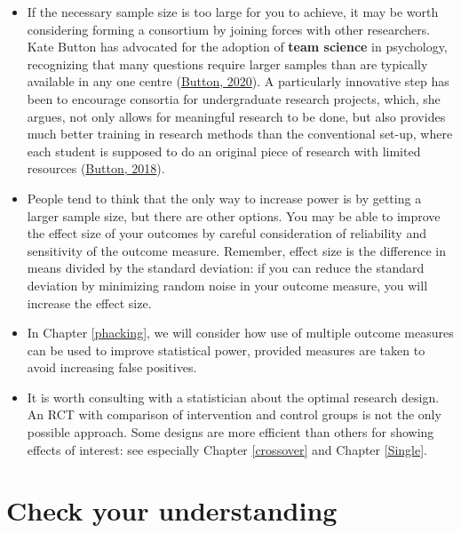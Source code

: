 \documentclass{krantz}
\providecommand{\tightlist}{%
\setlength{\itemsep}{0pt}\setlength{\parskip}{0pt}}
\begin{document}
\begin{itemize}
\tightlist
\item
  If the necessary sample size is too large for you to achieve, it may be worth considering forming a consortium by joining forces with other researchers. Kate Button has advocated for the adoption of \textbf{team science} in psychology, recognizing that many questions require larger samples than are typically available in any one centre (\protect\hyperlink{ref-button2020}{Button, 2020}). A particularly innovative step has been to encourage consortia for undergraduate research projects, which, she argues, not only allows for meaningful research to be done, but also provides much better training in research methods than the conventional set-up, where each student is supposed to do an original piece of research with limited resources (\protect\hyperlink{ref-button2018}{Button, 2018}).\\
\item
  People tend to think that the only way to increase power is by getting a larger sample size, but there are other options. You may be able to improve the effect size of your outcomes by careful consideration of reliability and sensitivity of the outcome measure. Remember, effect size is the difference in means divided by the standard deviation: if you can reduce the standard deviation by minimizing random noise in your outcome measure, you will increase the effect size.\\
\item
  In Chapter \ref{phacking}, we will consider how use of multiple outcome measures can be used to improve statistical power, provided measures are taken to avoid increasing false positives.
\item
  It is worth consulting with a statistician about the optimal research design. An RCT with comparison of intervention and control groups is not the only possible approach. Some designs are more efficient than others for showing effects of interest: see especially Chapter \ref{crossover} and Chapter \ref{Single}.
\end{itemize}

\hypertarget{check-your-understanding-12}{%
\section{Check your understanding}\label{check-your-understanding-12}}
\end{document}
